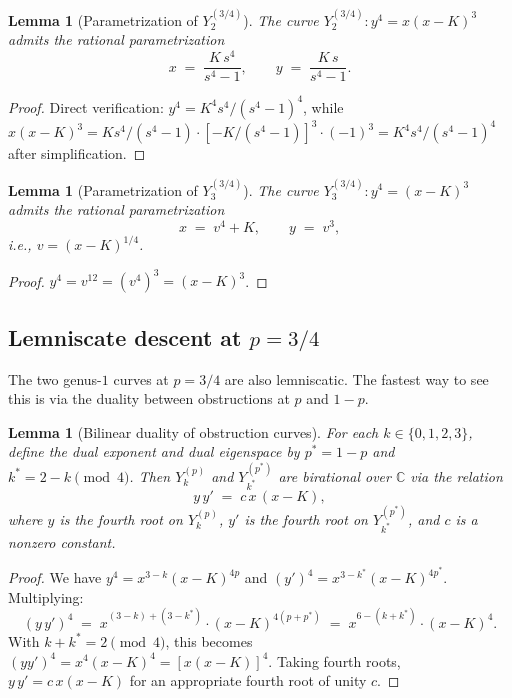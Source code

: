\documentclass[11pt,a4paper]{article}
\theoremstyle{plain}
\newtheorem{lemma}[theorem]{Lemma}
\theoremstyle{definition}
\theoremstyle{remark}
\newcommand{\C}{\mathbb{C}}
\begin{document}
\begin{lemma}[Parametrization of $Y_2^{(3/4)}$]\label{lem:Y2-34-param}
The curve $Y_2^{(3/4)}\colon y^4 = x(x-K)^3$ admits the rational parametrization
\[
  x \;=\; \frac{K\,s^4}{s^4 - 1}, \qquad y \;=\; \frac{K\,s}{s^4 - 1}.
\]
\end{lemma}

\begin{proof}
Direct verification: $y^4 = K^4 s^4/(s^4-1)^4$, while $x(x-K)^3 = K s^4/(s^4-1) \cdot [-K/(s^4-1)]^3 \cdot (-1)^3 = K^4 s^4/(s^4-1)^4$ after simplification.
\end{proof}

\begin{lemma}[Parametrization of $Y_3^{(3/4)}$]\label{lem:Y3-34-param}
The curve $Y_3^{(3/4)}\colon y^4 = (x-K)^3$ admits the rational parametrization
\[
  x \;=\; v^4 + K, \qquad y \;=\; v^3,
\]
i.e., $v = (x-K)^{1/4}$.
\end{lemma}

\begin{proof}
$y^4 = v^{12} = (v^4)^3 = (x-K)^3$.
\end{proof}

\subsection*{Lemniscate descent at $p = 3/4$}

The two genus-$1$ curves at $p = 3/4$ are also lemniscatic. The fastest way to see this is via the duality between obstructions at $p$ and $1-p$.

\begin{lemma}[Bilinear duality of obstruction curves]\label{lem:duality}
For each $k \in \{0, 1, 2, 3\}$, define the dual exponent and dual eigenspace by $p^* = 1 - p$ and $k^* = 2 - k \pmod{4}$. Then $Y_k^{(p)}$ and $Y_{k^*}^{(p^*)}$ are birational over $\C$ via the relation
\[
  y\,y' \;=\; c\,x\,(x - K),
\]
where $y$ is the fourth root on $Y_k^{(p)}$, $y'$ is the fourth root on $Y_{k^*}^{(p^*)}$, and $c$ is a nonzero constant.
\end{lemma}

\begin{proof}
We have $y^4 = x^{3-k}(x-K)^{4p}$ and $(y')^4 = x^{3-k^*}(x-K)^{4p^*}$. Multiplying:
\[
  (y\,y')^4 \;=\; x^{(3-k)+(3-k^*)} \cdot (x-K)^{4(p + p^*)} \;=\; x^{6 - (k+k^*)} \cdot (x-K)^{4}.
\]
With $k + k^* = 2 \pmod 4$, this becomes $(yy')^4 = x^4 (x - K)^4 = [x(x-K)]^4$. Taking fourth roots, $y\,y' = c\,x(x-K)$ for an appropriate fourth root of unity $c$.
\end{proof}
\end{document}
